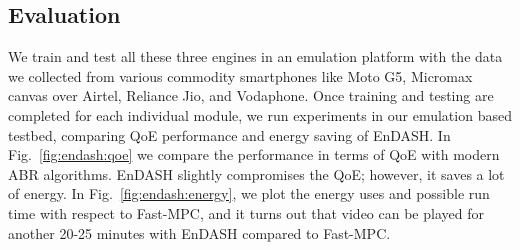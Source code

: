 \subsection{Evaluation}
We train and test all these three engines in an emulation platform with the data we collected from various commodity smartphones like Moto G5, Micromax canvas over Airtel, Reliance Jio, and Vodaphone. Once training and testing are completed for each individual module, we run experiments in our emulation based testbed, comparing QoE performance and energy saving of EnDASH. In Fig.~\ref{fig:endash:qoe} we compare the performance in terms of QoE with modern ABR algorithms. EnDASH slightly compromises the QoE; however, it saves a lot of energy. In Fig.~\ref{fig:endash:energy}, we plot the energy uses and possible run time with respect to Fast-MPC, and it turns out that video can be played for another 20-25 minutes with EnDASH compared to Fast-MPC.

